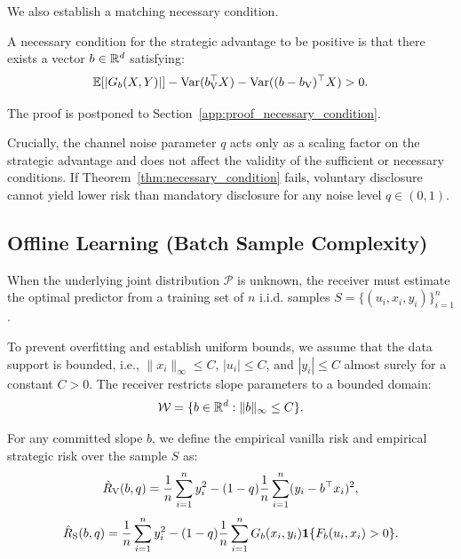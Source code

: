 We also establish a matching necessary condition.
\begin{theorem}
\label{thm:necessary_condition}
A necessary condition for the strategic advantage to be positive is that there exists a vector $b \in \mathbb{R}^d$ satisfying:
\begin{equation}
    \label{eq:necessary_condition}
    \mathbb{E}[|G_b(X, Y)|] - \mathrm{Var}(b_{\mathrm{V}}^\top X) - \mathrm{Var}((b - b_{\mathrm{V}})^\top X) > 0.
\end{equation}
\end{theorem}
The proof is postponed to Section~\ref{app:proof_necessary_condition}.

\begin{remark}
Crucially, the channel noise parameter $q$ acts only as a scaling factor on the strategic advantage and does not affect the validity of the sufficient or necessary conditions. If Theorem~\ref{thm:necessary_condition} fails, voluntary disclosure cannot yield lower risk than mandatory disclosure for any noise level $q \in (0, 1)$.
\end{remark}

\subsection{Offline Learning (Batch Sample Complexity)}
\label{sec:regression_offline}
When the underlying joint distribution $\mathcal{P}$ is unknown, the receiver must estimate the optimal predictor from a training set of $n$ i.i.d. samples $S = \{(u_i, x_i, y_i)\}_{i=1}^n$. 

To prevent overfitting and establish uniform bounds, we assume that the data support is bounded, i.e., $\|x_i\|_\infty \le C$, $|u_i| \le C$, and $|y_i| \le C$ almost surely for a constant $C > 0$. The receiver restricts slope parameters to a bounded domain:
\begin{equation}
    \mathcal{W} = \{b \in \mathbb{R}^d : \|b\|_\infty \le C\}.
\end{equation}

For any committed slope $b$, we define the empirical vanilla risk and empirical strategic risk over the sample $S$ as:
\begin{equation}
    \label{eq:empirical_vanilla_risk}
    \hat{R}_{\mathrm{V}}(b, q) = \frac{1}{n}\sum_{i=1}^n y_i^2 - (1 - q)\frac{1}{n}\sum_{i=1}^n (y_i - b^\top x_i)^2,
\end{equation}
\begin{equation}
    \label{eq:empirical_strategic_risk}
    \hat{R}_{\mathrm{S}}(b, q) = \frac{1}{n}\sum_{i=1}^n y_i^2 - (1 - q)\frac{1}{n}\sum_{i=1}^n G_b(x_i, y_i) \mathbf{1}\{F_b(u_i, x_i) > 0\}.
\end{equation}


